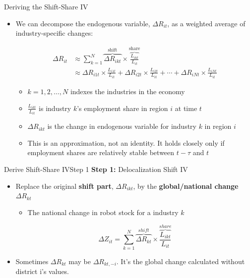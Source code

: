 \documentclass[dvipsnames,hyperref={pdfpagelabels=false}]{beamer}
\begin{document}
\begin{frame}{Deriving the Shift-Share IV} 
	\begin{itemize}
		\item We can decompose the endogenous variable, $\Delta R_{it}$, as a weighted average of industry-specific changes:
		
		\begin{align*}
			\Delta R_{it} &\approx\sum_{k=1}^{N} \overbrace{\Delta R_{ikt}}^{\text{shift}} \times \overbrace{\frac{L_{ikt}}{L_{it}}}^{\text{share}} \\
			&\approx \Delta R_{i1t} \times \frac{L_{i1t}}{L_{it}} + \Delta R_{i2t} \times \frac{L_{i2t}}{L_{it}} + \cdots + \Delta R_{iNt} \times \frac{L_{iNt}}{L_{it}}
		\end{align*}
		
		\begin{itemize}
			\item $k = 1,2,\ldots,N$ indexes the industries in the economy
			\vspace{0.2cm}
			\item $\frac{L_{ikt}}{L_{it}}$ is industry $k$'s employment share in region $i$ at time $t$ 
			\vspace{0.2cm}
			\item $\Delta R_{ikt}$ is the change in endogenous variable for industry $k$ in region $i$ 
			\vspace{0.2cm}
			\item This is an approximation, not an identity. It holds closely only if employment shares are relatively stable between $t-\tau$ and $t$
		\end{itemize}
	\end{itemize}
\end{frame}


\begin{frame}{Derive Shift-Share IV}{Step 1}
	\textbf{Step 1:} Delocalization Shift IV
							\vspace{0.2cm}
	\begin{itemize}
		\item Replace the original \textbf{shift part}, $\Delta R_{ikt}$, by the \textbf{global/national change} $\Delta R_{kt}$ 
			\begin{itemize}
									\vspace{0.2cm}
		\item The national change in robot stock for a industry $k$
			\end{itemize}

	\[ \Delta Z_{it}=\sum_{k=1}^{N} \overbrace{\Delta R_{kt}}^{shift} \times  \overbrace{\frac{L_{ikt}}{L_{it}}}^{share} \]


\item Sometimes $\Delta R_{kt}$ may be $\Delta R_{kt,-i}$. It's the global change calculated without district i's values.
	\end{itemize}

\end{frame}
\end{document}
